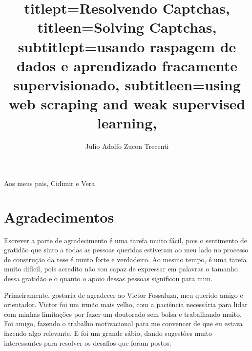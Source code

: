 \documentclass[12pt,twoside,brazilian]{book}
\title{
    titlept={Resolvendo Captchas},
    titleen={Solving Captchas},
    subtitlept={usando raspagem de dados e aprendizado fracamente supervisionado},
    subtitleen={using web scraping and weak supervised learning},
}
\author{Julio Adolfo Zucon Trecenti}
\begin{document}

\frontmatter

\pagestyle{plain}

\onehalfspacing %

\maketitle %


\begin{dedicatoria}
Aos meus pais,
Cidimir e Vera
\end{dedicatoria}


\chapter*{Agradecimentos}

Escrever a parte de agradecimento é uma tarefa muito fácil, pois o sentimento de gratidão que sinto a todas as pessoas queridas estiveram ao meu lado no processo de construção da tese é muito forte e verdadeiro. Ao mesmo tempo, é uma tarefa muito difícil, pois acredito não sou capaz de expressar em palavras o tamanho dessa gratidão e o quanto o apoio dessas pessoas significou para mim.

Primeiramente, gostaria de agradecer ao Victor Fossaluza, meu querido amigo e orientador. Victor foi um irmão mais velho, com a paciência necessária para lidar com minhas limitações por fazer um doutorado sem bolsa e trabalhando muito. Foi amigo, fazendo o trabalho motivacional para me convencer de que eu estava fazendo algo relevante. E foi um grande sábio, dando sugestões muito interessantes para resolver os desafios que foram postos.
\end{document}
